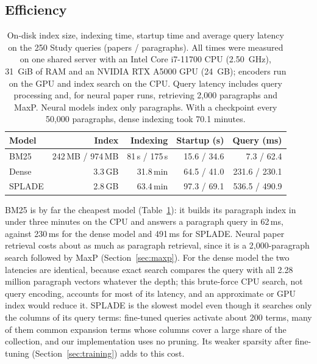 \documentclass[sigconf,nonacm]{acmart}
\begin{document}
\subsection{Efficiency}
\label{sec:efficiency}
\begin{table}[t]
  \caption{On-disk index size, indexing time, startup time and average query
    latency on the 250 Study queries (papers / paragraphs). All times
    were measured on one shared server with an Intel Core i7-11700 CPU
    (2.50~GHz), 31~GiB of RAM and an NVIDIA RTX A5000 GPU (24~GB);
    encoders run on the GPU and index search on the CPU. Query latency
    includes query processing and, for neural paper runs, retrieving
    2,000 paragraphs and MaxP. Neural models index only paragraphs. With
    a checkpoint every 50,000 paragraphs, dense indexing took 70.1 minutes.}
  \label{tab:efficiency}
  \small
  \begin{tabular}{lrrrr}
    \toprule
    Model & Index & Indexing & Startup (s) & Query (ms) \\
    \midrule
    BM25   & 242\,MB / 974\,MB & 81\,s / 175\,s & 15.6 / 34.6 & 7.3 / 62.4 \\
    Dense  & 3.3\,GB          & 31.8\,min      & 64.5 / 41.0 & 231.6 / 230.1 \\
    SPLADE & 2.8\,GB          & 63.4\,min      & 97.3 / 69.1 & 536.5 / 490.9 \\
    \bottomrule
  \end{tabular}
\end{table}
BM25 is by far the cheapest model (Table~\ref{tab:efficiency}): it builds its 
paragraph index in under three minutes on the CPU and answers a paragraph query 
in 62\,ms, against 230\,ms for the dense model and 491\,ms for SPLADE. Neural 
paper retrieval costs about as much as paragraph retrieval, since it is a 
2,000-paragraph search followed by MaxP (Section~\ref{sec:maxp}). For the dense 
model the two latencies are identical, because exact search compares the query 
with all 2.28 million paragraph vectors whatever the depth; this brute-force CPU 
search, not query encoding, accounts for most of its latency, and an approximate 
or GPU index would reduce it. SPLADE is the slowest model even though it searches 
only the columns of its query terms: fine-tuned queries activate about 200 terms, 
many of them common expansion terms whose columns cover a large share of the 
collection, and our implementation uses no pruning. Its weaker sparsity after 
fine-tuning (Section~\ref{sec:training}) adds to this cost.
\end{document}

